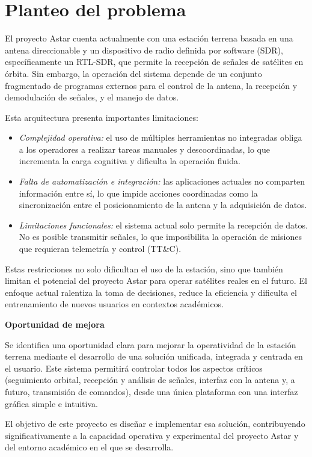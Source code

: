 \section*{Planteo del problema}

El proyecto Astar cuenta actualmente con una estación terrena basada en una antena direccionable y un dispositivo de radio definida por software (SDR), específicamente un RTL-SDR, que permite la recepción de señales de satélites en órbita. Sin embargo, la operación del sistema depende de un conjunto fragmentado de programas externos para el control de la antena, la recepción y demodulación de señales, y el manejo de datos.

Esta arquitectura presenta importantes limitaciones:

\begin{itemize}
    \item \textit{Complejidad operativa:} el uso de múltiples herramientas no integradas obliga a los operadores a realizar tareas manuales y descoordinadas, lo que incrementa la carga cognitiva y dificulta la operación fluida.
    
    \item \textit{Falta de automatización e integración:} las aplicaciones actuales no comparten información entre sí, lo que impide acciones coordinadas como la sincronización entre el posicionamiento de la antena y la adquisición de datos.
    
    \item \textit{Limitaciones funcionales:} el sistema actual solo permite la recepción de datos. No es posible transmitir señales, lo que imposibilita la operación de misiones que requieran telemetría y control (TT\&C).
\end{itemize}

Estas restricciones no solo dificultan el uso de la estación, sino que también limitan el potencial del proyecto Astar para operar satélites reales en el futuro. El enfoque actual ralentiza la toma de decisiones, reduce la eficiencia y dificulta el entrenamiento de nuevos usuarios en contextos académicos.

\textbf{Oportunidad de mejora}

Se identifica una oportunidad clara para mejorar la operatividad de la estación terrena mediante el desarrollo de una solución unificada, integrada y centrada en el usuario. Este sistema permitirá controlar todos los aspectos críticos (seguimiento orbital, recepción y análisis de señales, interfaz con la antena y, a futuro, transmisión de comandos), desde una única plataforma con una interfaz gráfica simple e intuitiva.

El objetivo de este proyecto es diseñar e implementar esa solución, contribuyendo significativamente a la capacidad operativa y experimental del proyecto Astar y del entorno académico en el que se desarrolla.
